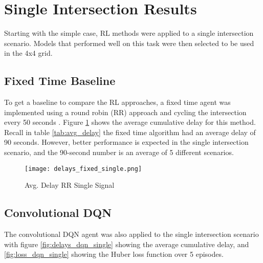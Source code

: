 \documentclass[letterpaper]{article} %
\begin{document}

\section{Single Intersection Results}
Starting with the simple case, RL methods were applied to a single intersection scenario.
Models that performed well on this task were then selected to be used in the 4x4 grid.

\subsection{Fixed Time Baseline}
To get a baseline to compare the RL approaches, a fixed time agent was implemented using a round robin (RR) approach and cycling the intersection every 50 seconds \cite{Chaudhuri2021}.
Figure \ref{fig:delays_fixed_single} shows the average cumulative delay for this method.
Recall in table \ref{tab:avg_delay} the fixed time algorithm had an average delay of 90 seconds.
However, better performance is expected in the single intersection scenario, and the 90-second number is an average of 5 different scenarios.

\begin{figure}[htbp]
  \centering
  \texttt{[image: delays\_fixed\_single.png]}
  \caption{Avg. Delay RR Single Signal}
  \label{fig:delays_fixed_single}
\end{figure}


\subsection{Convolutional DQN}
The convolutional DQN agent was also applied to the single intersection scenario with figure \ref{fig:delays_dqn_single} showing the average cumulative delay,
and \ref{fig:loss_dqn_single} showing the Huber loss function over 5 episodes.
\end{document}
